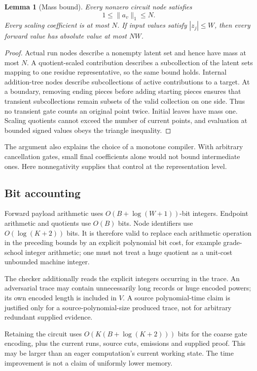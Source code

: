 \documentclass[11pt]{article}
\newtheorem{lemma}[theorem]{Lemma}
\theoremstyle{definition}\newtheorem{definition}[theorem]{Definition}
\theoremstyle{remark}\newtheorem{remark}[theorem]{Remark}
\begin{document}
\begin{lemma}[Mass bound]
\label{lem:mass}
Every nonzero circuit node satisfies
\[
 1\le\|a_v\|_1\le N.
\]
Every scaling coefficient is at most $N$. If input values satisfy $|z_j|\le W$,
then every forward value has absolute value at most $NW$.
\end{lemma}
\begin{proof}
Actual run nodes describe a nonempty latent set and hence have mass at most
$N$. A quotient-scaled contribution describes a subcollection of the latent sets
mapping to one residue representative, so the same bound holds. Internal
addition-tree nodes describe subcollections of active contributions to a target.
At a boundary, removing ending pieces before adding starting pieces ensures that
transient subcollections remain subsets of the valid collection on one side.
Thus no transient gate counts an original point twice. Initial leaves have mass
one. Scaling quotients cannot exceed the number of current points, and evaluation
at bounded signed values obeys the triangle inequality.
\end{proof}

The argument also explains the choice of a monotone compiler. With arbitrary
cancellation gates, small final coefficients alone would not bound intermediate
ones. Here nonnegativity supplies that control at the representation level.

\subsection{Bit accounting}
Forward payload arithmetic uses $O(B+\log(W+1))$-bit integers. Endpoint arithmetic
and quotients use $O(B)$ bits. Node identifiers use $O(\log(K+2))$ bits. It is
therefore valid to replace each arithmetic operation in the preceding bounds
by an explicit polynomial bit cost, for example grade-school integer arithmetic;
one must not treat a huge quotient as a unit-cost unbounded machine integer.

The checker additionally reads the explicit integers occurring in the trace.
An adversarial trace may contain unnecessarily long records or huge encoded
powers; its own encoded length is included in $V$. A source polynomial-time
claim is justified only for a source-polynomial-size produced trace, not for
arbitrary redundant supplied evidence.

Retaining the circuit uses $O(K(B+\log(K+2)))$ bits for the coarse gate encoding,
plus the current runs, source cuts, emissions and supplied proof. This may be
larger than an eager computation's current working state. The time improvement
is not a claim of uniformly lower memory.
\end{document}
